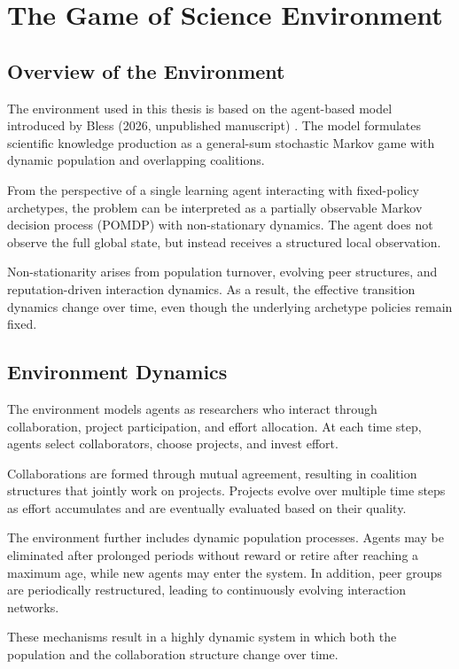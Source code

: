 \documentclass[english,bachelor]{hsluthesis}
\begin{document}
\chapter{The Game of Science Environment}
\section{Overview of the Environment}
The environment used in this thesis is based on the agent-based model introduced by Bless (2026, unpublished manuscript) \cite{bless_game_of_science_2026}. The model formulates scientific knowledge production as a general-sum stochastic Markov game with dynamic population and overlapping coalitions.

From the perspective of a single learning agent interacting with fixed-policy archetypes, the problem can be interpreted as a partially observable Markov decision process (POMDP) with non-stationary dynamics. The agent does not observe the full global state, but instead receives a structured local observation.

Non-stationarity arises from population turnover, evolving peer structures, and reputation-driven interaction dynamics. As a result, the effective transition dynamics change over time, even though the underlying archetype policies remain fixed.

\section{Environment Dynamics}
The environment models agents as researchers who interact through collaboration, project participation, and effort allocation. At each time step, agents select collaborators, choose projects, and invest effort.

Collaborations are formed through mutual agreement, resulting in coalition structures that jointly work on projects. Projects evolve over multiple time steps as effort accumulates and are eventually evaluated based on their quality.

The environment further includes dynamic population processes. Agents may be eliminated after prolonged periods without reward or retire after reaching a maximum age, while new agents may enter the system. In addition, peer groups are periodically restructured, leading to continuously evolving interaction networks.

These mechanisms result in a highly dynamic system in which both the population and the collaboration structure change over time.
\end{document}
